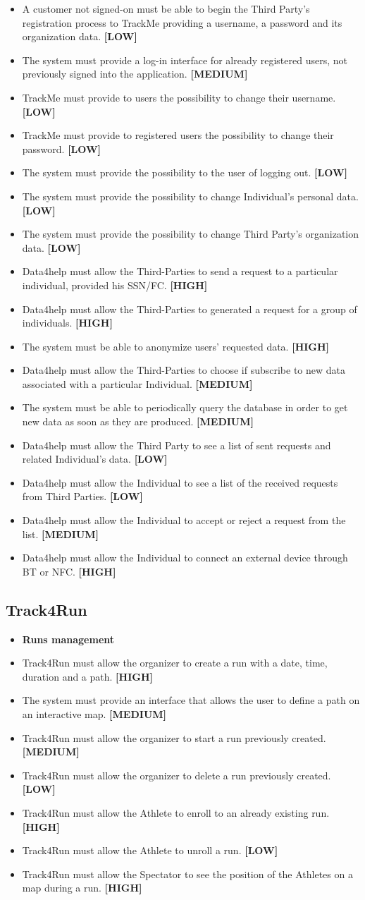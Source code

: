 \documentclass[a4paper, hidelinks, 12pt]{report}
\newcommand\requirement[1]{\item[{[REQ-#1]}] }
\begin{document}
\begin{itemize}
		\requirement{2} A customer not signed-on must be able to begin the Third Party’s registration process to TrackMe providing a username, a password and its organization data. \textbf{[LOW]}
		\requirement{3}The system must provide a log-in interface for already registered users, not previously signed into the application. \textbf{[MEDIUM]}
		\requirement{4}TrackMe must provide to users the possibility to change their username. \textbf{[LOW]}
		\requirement{5}TrackMe must provide to registered users the possibility to change their password. \textbf{[LOW]}
		\requirement{6}The system must provide the possibility to the user of logging out. \textbf{[LOW]}
		\requirement{7}The system must provide the possibility to change Individual’s personal data. \textbf{[LOW]}
		\requirement{8}The system must provide the possibility to change Third Party’s organization data. \textbf{[LOW]}
		\requirement{9} Data4help must allow the Third-Parties to send a request to a particular individual, provided his SSN/FC.  \textbf{[HIGH]}
	\requirement{10} Data4help must allow the Third-Parties to generated a request for a group of individuals.  \textbf{[HIGH]}
	\requirement{11} The system must be able to anonymize users’ requested data. \textbf{[HIGH]}
	\requirement{12} Data4help must allow the Third-Parties to choose if subscribe to new data associated with a particular Individual. \textbf{[MEDIUM]}
	\requirement{13} The system must be able to periodically query the database in order to get new data as soon as they are produced. \textbf{[MEDIUM]}
	\requirement{14} Data4help must allow the Third Party to see a list of sent requests and related Individual’s data. \textbf{[LOW]}
	\requirement{15} Data4help must allow the Individual to see a list of the received requests from Third Parties. \textbf{[LOW]}
	\requirement{16} Data4help must allow the Individual to accept or reject a request from the list. \textbf{[MEDIUM]}
	\requirement{17} Data4help must allow the Individual to connect an external device through BT or NFC. \textbf{[HIGH]}
	\end{itemize}
	
	\subsection{Track4Run}
	
	\begin{itemize}
	\item \textbf{Runs management}
	\requirement{24} Track4Run must allow the organizer to create a run with a date, time, duration and a path. \textbf{[HIGH]}
	\requirement{25} The system must provide an interface that allows the user to define a path on an interactive map. \textbf{[MEDIUM]}
	\requirement{26} Track4Run must allow the organizer to start a run previously
created. \textbf{[MEDIUM]}
	\requirement{27} Track4Run must allow the organizer to delete a run previously created. \textbf{[LOW]}
	\requirement{28} Track4Run must allow the Athlete to enroll to an already existing run. \textbf{[HIGH]}
	\requirement{29}  Track4Run must allow the Athlete to unroll a run. \textbf{[LOW]}
 	\requirement{30} Track4Run must allow the Spectator to see the position of the
Athletes on a map during a run. \textbf{[HIGH]}
	\end{itemize}
\end{document}
